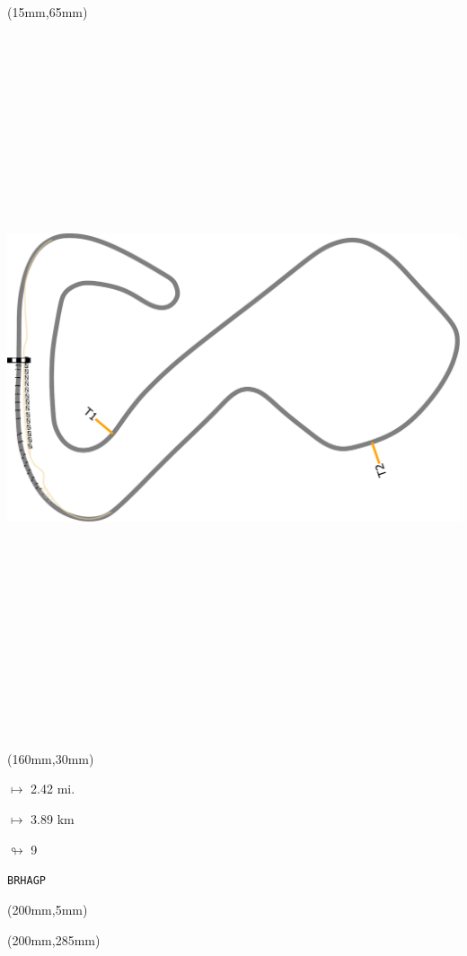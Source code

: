 \begin{textblock*}{185mm}(15mm,65mm)%
\centering
\mbox{\includegraphics[width=185mm,height=210mm,keepaspectratio]{PT/BRHAGP.pdf}}
\end{textblock*}
\begin{textblock*}{40mm}(160mm,30mm)%
\Large
\par$\mapsto$ 2.42 mi.
\par$\mapsto$ 3.89 km
\par$\looparrowright$ 9
\par\hfill\tiny\tt BRHAGP\\
\end{textblock*}
\begin{textblock*}{20mm}(200mm,5mm)%
\fbox{\thepage}
\label{BRHAGP}
\end{textblock*}
\begin{textblock*}{20mm}(200mm,285mm)%
\fbox{\thepage}
\end{textblock*}

